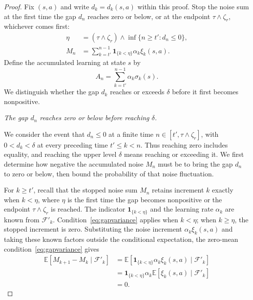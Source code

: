 \begin{proof}
Fix $(s,a)$ and write $d_k=d_k(s,a)$ within this proof. Stop the noise sum at the first time the gap $d_n$ reaches zero or below, or at the endpoint $\tau\wedge\zeta_r$, whichever comes first:
\[
\begin{aligned}
\eta&=(\tau\wedge\zeta_r)\wedge\inf\{n\ge t':d_n\le0\},\\
M_n&=\sum_{k=t'}^{n-1}\mathbf1_{\{k<\eta\}}\alpha_k\xi_k(s,a).
\end{aligned}
\]
Define the accumulated learning at state $s$ by
\begin{equation}\label{eq:clock}
A_n=\sum_{k=t'}^{n-1}\alpha_k\sigma_k(s).
\end{equation}
We distinguish whether the gap $d_k$ reaches or exceeds $\delta$ before it first becomes nonpositive.

\emph{The gap $d_n$ reaches zero or below before reaching $\delta$.}

We consider the event that $d_n\le0$ at a finite time $n\in[t',\tau\wedge\zeta_r]$, with $0<d_k<\delta$ at every preceding time $t'\le k<n$. Thus reaching zero includes equality, and reaching the upper level $\delta$ means reaching or exceeding it. We first determine how negative the accumulated noise $M_n$ must be to bring the gap $d_n$ to zero or below, then bound the probability of that noise fluctuation.

For $k\ge t'$, recall that the stopped noise sum $M_n$ retains increment $k$ exactly when $k<\eta$, where $\eta$ is the first time the gap becomes nonpositive or the endpoint $\tau\wedge\zeta_r$ is reached. The indicator $\mathbf1_{\{k<\eta\}}$ and the learning rate $\alpha_k$ are known from $\mathcal F'_k$. Condition~\eqref{eq:gapvariance} applies when $k<\eta$; when $k\ge\eta$, the stopped increment is zero. Substituting the noise increment $\alpha_k\xi_k(s,a)$ and taking these known factors outside the conditional expectation, the zero-mean condition~\eqref{eq:gapvariance} gives
\begin{equation}
\begin{aligned}
\mathbb E[M_{k+1}-M_k\mid\mathcal F'_k]
&=\mathbb E[\mathbf1_{\{k<\eta\}}\alpha_k\xi_k(s,a)
\mid\mathcal F'_k]\\
&=\mathbf1_{\{k<\eta\}}\alpha_k
\mathbb E[\xi_k(s,a)\mid\mathcal F'_k]\\
&=0.
\end{aligned}
\label{eq:gap-noise-mean}
\end{equation}


\end{proof}

